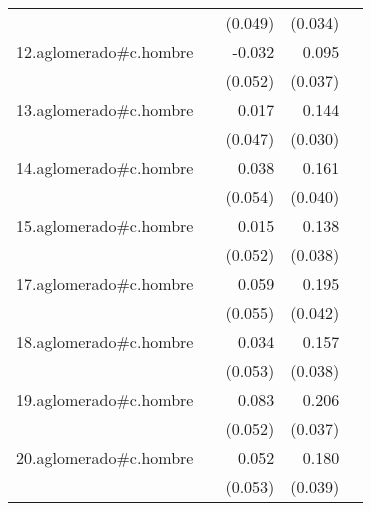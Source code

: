 {\begin{longtable}{l*{4}{D{.}{.}{-1}}}
            &                     &     (0.049)         &     (0.034)         &                     \\
\addlinespace
12.aglomerado#c.hombre&                     &      -0.032         &       0.095\sym{*}  &                     \\
            &                     &     (0.052)         &     (0.037)         &                     \\
\addlinespace
13.aglomerado#c.hombre&                     &       0.017         &       0.144\sym{***}&                     \\
            &                     &     (0.047)         &     (0.030)         &                     \\
\addlinespace
14.aglomerado#c.hombre&                     &       0.038         &       0.161\sym{***}&                     \\
            &                     &     (0.054)         &     (0.040)         &                     \\
\addlinespace
15.aglomerado#c.hombre&                     &       0.015         &       0.138\sym{***}&                     \\
            &                     &     (0.052)         &     (0.038)         &                     \\
\addlinespace
17.aglomerado#c.hombre&                     &       0.059         &       0.195\sym{***}&                     \\
            &                     &     (0.055)         &     (0.042)         &                     \\
\addlinespace
18.aglomerado#c.hombre&                     &       0.034         &       0.157\sym{***}&                     \\
            &                     &     (0.053)         &     (0.038)         &                     \\
\addlinespace
19.aglomerado#c.hombre&                     &       0.083         &       0.206\sym{***}&                     \\
            &                     &     (0.052)         &     (0.037)         &                     \\
\addlinespace
20.aglomerado#c.hombre&                     &       0.052         &       0.180\sym{***}&                     \\
            &                     &     (0.053)         &     (0.039)         &                     \\

\end{longtable}}
